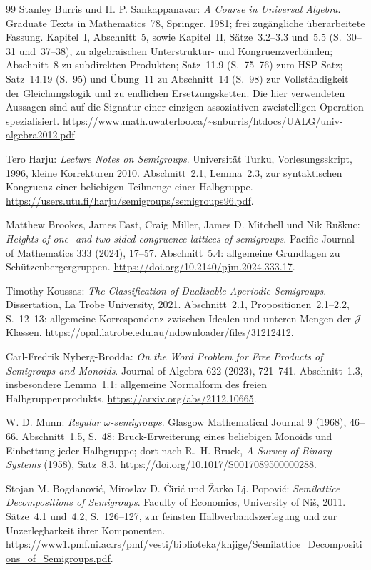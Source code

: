\begin{thebibliography}{99}
Stanley Burris und H. P. Sankappanavar:
\emph{A Course in Universal Algebra}.
Graduate Texts in Mathematics~78, Springer, 1981;
frei zugängliche überarbeitete Fassung.
Kapitel~I, Abschnitt~5, sowie Kapitel~II, Sätze~3.2--3.3 und~5.5
(S.~30--31 und~37--38), zu algebraischen Unterstruktur- und
Kongruenzverbänden; Abschnitt~8 zu subdirekten Produkten;
Satz~11.9 (S.~75--76) zum HSP-Satz;
Satz~14.19 (S.~95) und Übung~11 zu Abschnitt~14 (S.~98)
zur Vollständigkeit der Gleichungslogik und zu endlichen Ersetzungsketten.
Die hier verwendeten Aussagen sind auf die Signatur einer einzigen
assoziativen zweistelligen Operation spezialisiert.
\url{https://www.math.uwaterloo.ca/~snburris/htdocs/UALG/univ-algebra2012.pdf}.

Tero Harju: \emph{Lecture Notes on Semigroups}.
Universität Turku, Vorlesungsskript, 1996, kleine Korrekturen 2010.
Abschnitt~2.1, Lemma~2.3, zur syntaktischen Kongruenz
einer beliebigen Teilmenge einer Halbgruppe.
\url{https://users.utu.fi/harju/semigroups/semigroups96.pdf}.

Matthew Brookes, James East, Craig Miller, James D. Mitchell und Nik Ruškuc:
\emph{Heights of one- and two-sided congruence lattices of semigroups}.
Pacific Journal of Mathematics 333 (2024), 17--57.
Abschnitt~5.4: allgemeine Grundlagen zu Schützenbergergruppen.
\url{https://doi.org/10.2140/pjm.2024.333.17}.

Timothy Koussas: \emph{The Classification of Dualisable Aperiodic Semigroups}.
Dissertation, La Trobe University, 2021.
Abschnitt~2.1, Propositionen~2.1--2.2, S.~12--13:
allgemeine Korrespondenz zwischen Idealen und unteren Mengen
der $\mathcal J$-Klassen.
\url{https://opal.latrobe.edu.au/ndownloader/files/31212412}.

Carl-Fredrik Nyberg-Brodda:
\emph{On the Word Problem for Free Products of Semigroups and Monoids}.
Journal of Algebra 622 (2023), 721--741.
Abschnitt~1.3, insbesondere Lemma~1.1: allgemeine Normalform
des freien Halbgruppenprodukts.
\url{https://arxiv.org/abs/2112.10665}.

W. D. Munn: \emph{Regular $\omega$-semigroups}.
Glasgow Mathematical Journal 9 (1968), 46--66.
Abschnitt~1.5, S.~48: Bruck-Erweiterung eines beliebigen Monoids
und Einbettung jeder Halbgruppe; dort nach R.~H. Bruck,
\emph{A Survey of Binary Systems} (1958), Satz~8.3.
\url{https://doi.org/10.1017/S0017089500000288}.

Stojan M. Bogdanović, Miroslav D. Ćirić und Žarko Lj. Popović:
\emph{Semilattice Decompositions of Semigroups}.
Faculty of Economics, University of Niš, 2011.
Sätze~4.1 und~4.2, S.~126--127, zur feinsten
Halbverbandszerlegung und zur Unzerlegbarkeit ihrer Komponenten.
\url{https://www1.pmf.ni.ac.rs/pmf/vesti/biblioteka/knjige/Semilattice_Decompositions_of_Semigroups.pdf}.


\end{thebibliography}
